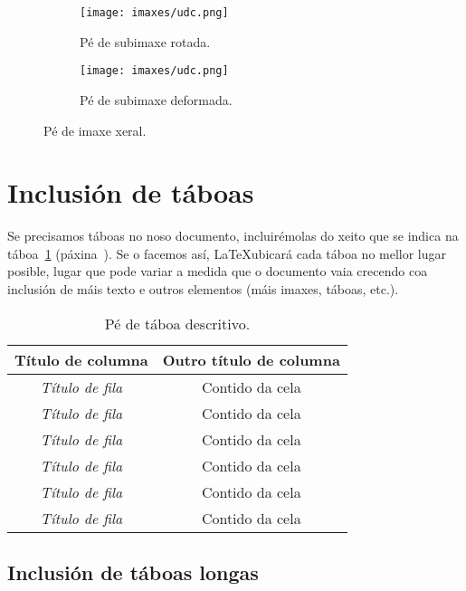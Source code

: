 \begin{figure}[hp!]
  \centering
  \begin{subfigure}[c]{0.3\textwidth}
    \texttt{[image: imaxes/udc.png]}
    \caption{Pé de subimaxe rotada.}
    \label{fig:subfigura-rotada}
  \end{subfigure}
  \hspace{0.1\textwidth}
  \begin{subfigure}[c]{0.3\textwidth}
    \texttt{[image: imaxes/udc.png]}
    \caption{Pé de subimaxe deformada.}
    \label{fig:subfigura-deformada}
  \end{subfigure}
  \caption{Pé de imaxe xeral.}
  \label{fig:exemplo-subfiguras}
\end{figure}

\section{Inclusión de táboas}

Se precisamos táboas no noso documento, incluirémolas do xeito que se
indica na táboa~\ref{tab:exemplo} (páxina~\pageref{tab:exemplo}). Se
o facemos así, \LaTeX ubicará cada táboa no mellor lugar posible,
lugar que pode variar a medida que o documento vaia crecendo coa
inclusión de máis texto e outros elementos (máis imaxes, táboas,
etc.).

\begin{table}[hp!]
  \centering
  \begin{tabular}{c|c}
  \rowcolor{udcpink!25}
  \textbf{Título de columna} & \textbf{Outro título de columna} \\\hline
  \textit{Título de fila} & Contido da cela \\
  \textit{Título de fila} & Contido da cela \\
  \textit{Título de fila} & Contido da cela \\
  \textit{Título de fila} & Contido da cela \\
  \textit{Título de fila} & Contido da cela \\
  \textit{Título de fila} & Contido da cela \\
  \end{tabular}
  \caption{Pé de táboa descritivo.}
  \label{tab:exemplo}
\end{table}

\subsection{Inclusión de táboas longas}

